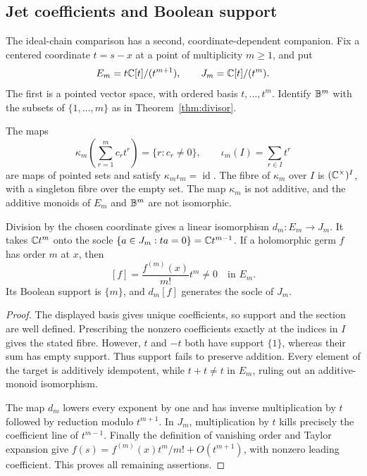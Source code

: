 \subsection{Jet coefficients and Boolean support}

The ideal-chain comparison has a second, coordinate-dependent companion. Fix a centered coordinate $t=s-x$ at a point of multiplicity $m\geq1$, and put
\[
 E_m=t\mathbb C[t]/(t^{m+1}),\qquad J_m=\mathbb C[t]/(t^m).
\]
The first is a pointed vector space, with ordered basis $t,\ldots,t^m$. Identify $\mathbb B^m$ with the subsets of $\{1,\ldots,m\}$ as in Theorem~\ref{thm:divisor}.

\begin{proposition}\label{prop:packet-jet-support}
The maps
\[
 \kappa_m\!\left(\sum_{r=1}^m c_rt^r\right)
       =\{r:c_r\ne0\},\qquad
 \iota_m(I)=\sum_{r\in I}t^r
\]
are maps of pointed sets and satisfy $\kappa_m\iota_m=\operatorname{id}$. The fibre of $\kappa_m$ over $I$ is $(\mathbb C^\times)^I$, with a singleton fibre over the empty set. The map $\kappa_m$ is not additive, and the additive monoids of $E_m$ and $\mathbb B^m$ are not isomorphic.

Division by the chosen coordinate gives a linear isomorphism $d_m:E_m\to J_m$. It takes $\mathbb C t^m$ onto the socle $\{a\in J_m:ta=0\}=\mathbb C t^{m-1}$. If a holomorphic germ $f$ has order $m$ at $x$, then
\[
 [f]=\frac{f^{(m)}(x)}{m!}t^m\ne0
       \quad\text{in }E_m.
\]
Its Boolean support is $\{m\}$, and $d_m[f]$ generates the socle of $J_m$.
\end{proposition}
\begin{proof}
The displayed basis gives unique coefficients, so support and the section are well defined. Prescribing the nonzero coefficients exactly at the indices in $I$ gives the stated fibre. However, $t$ and $-t$ both have support $\{1\}$, whereas their sum has empty support. Thus support fails to preserve addition. Every element of the target is additively idempotent, while $t+t\ne t$ in $E_m$, ruling out an additive-monoid isomorphism.

The map $d_m$ lowers every exponent by one and has inverse multiplication by $t$ followed by reduction modulo $t^{m+1}$. In $J_m$, multiplication by $t$ kills precisely the coefficient line of $t^{m-1}$. Finally the definition of vanishing order and Taylor expansion give
$f(s)=f^{(m)}(x)t^m/m!+O(t^{m+1})$, with nonzero leading coefficient. This proves all remaining assertions.
\end{proof}

